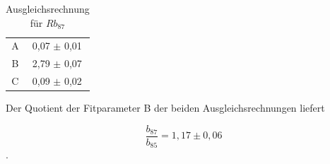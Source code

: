 \begin{table}[h!]
\centering
\begin{tabular}{cc} \toprule
\centering
A & 0,07 $\pm$ 0,01 \\
B & 2,79 $\pm$ 0,07 \\
C & 0,09 $\pm$ 0,02 \\
\bottomrule
\end{tabular}
\label{y}
\caption{Ausgleichsrechnung für $Rb_{87}$}
\end{table}

Der Quotient der Fitparameter B der beiden Ausgleichsrechnungen liefert

\begin{equation}
\frac{b_{87}}{b_{85}} = 1,17 \pm 0,06
\end{equation}
.
